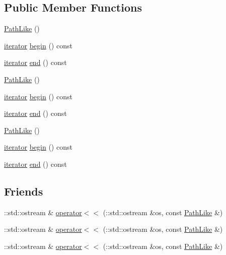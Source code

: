 \subsection*{Public Member Functions}
\begin{DoxyCompactItemize}
\item 
\mbox{\hyperlink{classfoo_1_1_path_like_a1fa696ea0514127f1a57cecd28bd08dc}{Path\+Like}} ()
\item 
\mbox{\hyperlink{structfoo_1_1_path_like_1_1iterator}{iterator}} \mbox{\hyperlink{classfoo_1_1_path_like_a7ca8b63139fd6fcada55fbf13ccf9c83}{begin}} () const
\item 
\mbox{\hyperlink{structfoo_1_1_path_like_1_1iterator}{iterator}} \mbox{\hyperlink{classfoo_1_1_path_like_aca85cd005890f1d19f416ca7e2c95f02}{end}} () const
\item 
\mbox{\hyperlink{classfoo_1_1_path_like_a1fa696ea0514127f1a57cecd28bd08dc}{Path\+Like}} ()
\item 
\mbox{\hyperlink{structfoo_1_1_path_like_1_1iterator}{iterator}} \mbox{\hyperlink{classfoo_1_1_path_like_a7ca8b63139fd6fcada55fbf13ccf9c83}{begin}} () const
\item 
\mbox{\hyperlink{structfoo_1_1_path_like_1_1iterator}{iterator}} \mbox{\hyperlink{classfoo_1_1_path_like_aca85cd005890f1d19f416ca7e2c95f02}{end}} () const
\item 
\mbox{\hyperlink{classfoo_1_1_path_like_a1fa696ea0514127f1a57cecd28bd08dc}{Path\+Like}} ()
\item 
\mbox{\hyperlink{structfoo_1_1_path_like_1_1iterator}{iterator}} \mbox{\hyperlink{classfoo_1_1_path_like_a7ca8b63139fd6fcada55fbf13ccf9c83}{begin}} () const
\item 
\mbox{\hyperlink{structfoo_1_1_path_like_1_1iterator}{iterator}} \mbox{\hyperlink{classfoo_1_1_path_like_aca85cd005890f1d19f416ca7e2c95f02}{end}} () const
\end{DoxyCompactItemize}
\subsection*{Friends}
\begin{DoxyCompactItemize}
\item 
\+::std\+::ostream \& \mbox{\hyperlink{classfoo_1_1_path_like_ab5544a5497a8a470802bd8fcf97c49da}{operator$<$$<$}} (\+::std\+::ostream \&os, const \mbox{\hyperlink{classfoo_1_1_path_like}{Path\+Like}} \&)
\item 
\+::std\+::ostream \& \mbox{\hyperlink{classfoo_1_1_path_like_ab5544a5497a8a470802bd8fcf97c49da}{operator$<$$<$}} (\+::std\+::ostream \&os, const \mbox{\hyperlink{classfoo_1_1_path_like}{Path\+Like}} \&)
\item 
\+::std\+::ostream \& \mbox{\hyperlink{classfoo_1_1_path_like_ab5544a5497a8a470802bd8fcf97c49da}{operator$<$$<$}} (\+::std\+::ostream \&os, const \mbox{\hyperlink{classfoo_1_1_path_like}{Path\+Like}} \&)
\end{DoxyCompactItemize}


